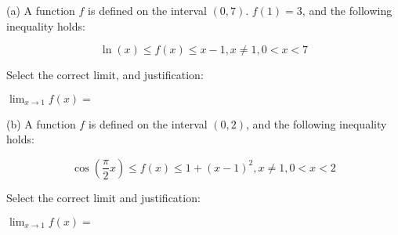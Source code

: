 \documentclass{ximera}
\begin{document}
\begin{exercise}

(a) A function $f$ is defined on the interval $(0,7)$. $f(1)=3$, and the following inequality holds:

$$\ln(x)\leq f(x) \leq x-1, x\neq 1, 0<x<7$$

Select the correct limit, and justification:

$\lim_{x\to 1} f(x)=$
\begin{prompt}
\begin{multipleChoice}
\end{multipleChoice}
\end{prompt}

(b) A function $f$ is defined on the interval $(0,2)$, and the following inequality holds:

$$\cos(\frac{\pi}{2}x)\leq f(x) \leq 1+(x-1)^2, x\neq 1, 0<x<2$$

Select the correct limit and justification:

$\lim_{x\to 1} f(x)=$
\begin{prompt}
\begin{multipleChoice}
\end{multipleChoice}
\end{prompt}

\end{exercise}

\end{document}
